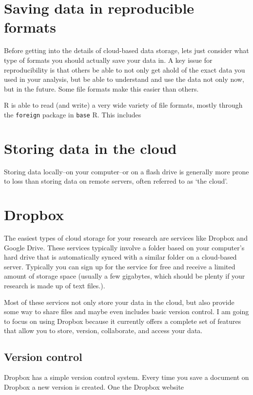 \documentclass[ChapterTOCs,krantz1]{krantz}\usepackage{graphicx, color}
\begin{document}
{{\section{Saving data in reproducible formats}

Before getting into the details of cloud-based data storage, lets just
consider what type of formats you should actually save your data in. A
key issue for reproducibility is that others be able to not only get
ahold of the exact data you used in your analysis, but be able to
understand and use the data not only now, but in the future. Some file
formats make this easier than others.

R is able to read (and write) a very wide variety of file
formats, mostly through the \texttt{foreign} package in \texttt{base}
R. This includes

\section{Storing data in the cloud}

Storing data locally--on your computer--or on a flash drive is generally
more prone to loss than storing data on remote servers, often referred
to as `the cloud'.

\section{Dropbox}

The easiest types of cloud storage for your research are services like
Dropbox and Google Drive. These services typically
involve a folder based on your computer's hard drive that is
automatically synced with a similar folder on a cloud-based server.
Typically you can sign up for the service for free and receive a limited
amount of storage space (usually a few gigabytes, which should be plenty
if your research is made up of text files.).

Most of these services not only store your data in the cloud, but also
provide some way to share files and maybe even includes basic version
control. I am going to focus on using Dropbox because it
currently offers a complete set of features that allow you to store,
version, collaborate, and access your data.

\subsection{Version control}

Dropbox has a simple version control system. Every time you
save a document on Dropbox a new version is created. One the
Dropbox website

}}
\end{document}
